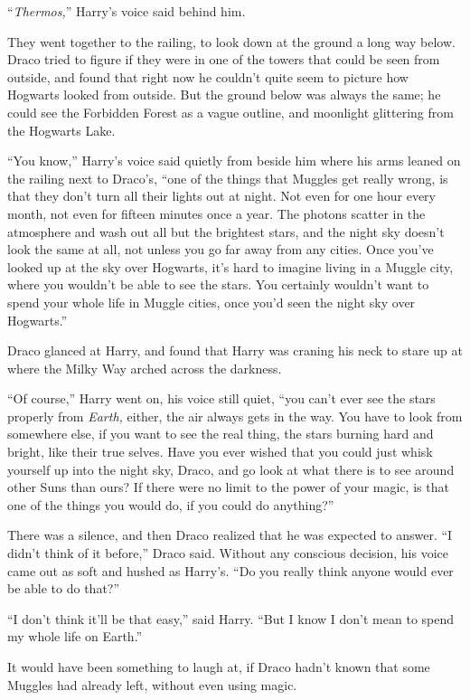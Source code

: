 ``\emph{Thermos,}'' Harry's voice said behind him.

They went together to the railing, to look down at the ground a long way below. Draco tried to figure if they were in one of the towers that could be seen from outside, and found that right now he couldn't quite seem to picture how Hogwarts looked from outside. But the ground below was always the same; he could see the Forbidden Forest as a vague outline, and moonlight glittering from the Hogwarts Lake.

``You know,'' Harry's voice said quietly from beside him where his arms leaned on the railing next to Draco's, ``one of the things that Muggles get really wrong, is that they don't turn all their lights out at night. Not even for one hour every month, not even for fifteen minutes once a year. The photons scatter in the atmosphere and wash out all but the brightest stars, and the night sky doesn't look the same at all, not unless you go far away from any cities. Once you've looked up at the sky over Hogwarts, it's hard to imagine living in a Muggle city, where you wouldn't be able to see the stars. You certainly wouldn't want to spend your whole life in Muggle cities, once you'd seen the night sky over Hogwarts.''

Draco glanced at Harry, and found that Harry was craning his neck to stare up at where the Milky Way arched across the darkness.

``Of course,'' Harry went on, his voice still quiet, ``you can't ever see the stars properly from \emph{Earth,} either, the air always gets in the way. You have to look from somewhere else, if you want to see the real thing, the stars burning hard and bright, like their true selves. Have you ever wished that you could just whisk yourself up into the night sky, Draco, and go look at what there is to see around other Suns than ours? If there were no limit to the power of your magic, is that one of the things you would do, if you could do anything?''

There was a silence, and then Draco realized that he was expected to answer. ``I didn't think of it before,'' Draco said. Without any conscious decision, his voice came out as soft and hushed as Harry's. ``Do you really think anyone would ever be able to do that?''

``I don't think it'll be that easy,'' said Harry. ``But I know I don't mean to spend my whole life on Earth.''

It would have been something to laugh at, if Draco hadn't known that some Muggles had already left, without even using magic.

